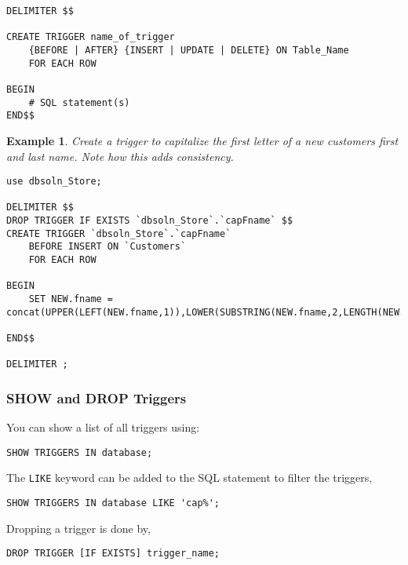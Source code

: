 \documentclass{article}
\newtheorem{example}{Example}
\begin{document}
\begin{lstlisting}[frame=single]  
DELIMITER $$

CREATE TRIGGER name_of_trigger
	{BEFORE | AFTER} {INSERT | UPDATE | DELETE} ON Table_Name
	FOR EACH ROW

BEGIN
	# SQL statement(s)	
END$$
\end{lstlisting} 




\begin{example}
Create a trigger to capitalize the first letter of a new customers first and last name.  Note how this adds consistency.  
\end{example}

\begin{lstlisting}[frame=single]  
use dbsoln_Store;

DELIMITER $$
DROP TRIGGER IF EXISTS `dbsoln_Store`.`capFname` $$
CREATE TRIGGER `dbsoln_Store`.`capFname`
	BEFORE INSERT ON `Customers`
	FOR EACH ROW

BEGIN
	SET NEW.fname = concat(UPPER(LEFT(NEW.fname,1)),LOWER(SUBSTRING(NEW.fname,2,LENGTH(NEW.fname))));

END$$

DELIMITER ;
\end{lstlisting} 




\subsubsection*{SHOW and DROP Triggers}

You can show a list of all triggers using: 

\begin{lstlisting}[frame=none]  
SHOW TRIGGERS IN database;
\end{lstlisting} 

\noindent The \texttt{LIKE} keyword can be added to the SQL statement to filter the triggers, 

\begin{lstlisting}[frame=none]  
SHOW TRIGGERS IN database LIKE 'cap%';
\end{lstlisting} 




\noindent Dropping a trigger is done by, 
\begin{lstlisting}[frame=none]  
DROP TRIGGER [IF EXISTS] trigger_name;
\end{lstlisting} 
\end{document}

